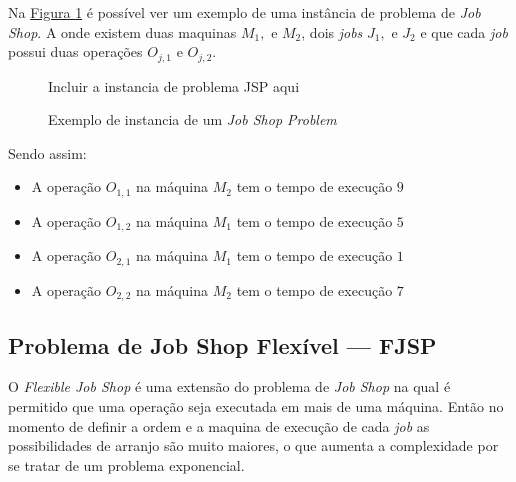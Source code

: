             Na 
            \hyperref[fig:ex-instancia-problema-JSP]{Figura \ref{fig:ex-instancia-problema-JSP}}
            é possível ver um exemplo de uma instância de problema de \textit{Job Shop}. 
            A onde existem duas maquinas $M_1, $ e $M_2$, 
            dois \textit{jobs} $J_1, $ e $J_2$ 
            e que cada \textit{job} possui 
            duas operações $O_{j,1} $ e $O_{j,2}$.\hfill\vspace{\onelineskip}

            \begin{figure}[ht]
                \centering
                \small{Incluir a instancia de problema JSP aqui}
                \caption{Exemplo de instancia de um \textit{Job Shop Problem}}
                \label{fig:ex-instancia-problema-JSP}
            \end{figure}
            
            \noindent Sendo assim:\hfill
            \begin{itemize}
                \item A operação $O_{1,1}$ na máquina $M_2$ tem o tempo de execução $9$
                \item A operação $O_{1,2}$ na máquina $M_1$ tem o tempo de execução $5$
                \item A operação $O_{2,1}$ na máquina $M_1$ tem o tempo de execução $1$
                \item A operação $O_{2,2}$ na máquina $M_2$ tem o tempo de execução $7$
            \end{itemize}
            



    \subsection{Problema de Job Shop Flexível — FJSP}
            O \textit{Flexible Job Shop} é uma extensão do problema de \textit{Job Shop} na qual é permitido que uma operação seja executada em mais de uma máquina. Então no momento de definir a ordem e a maquina de execução de cada \textit{job} as possibilidades de arranjo são muito maiores, o que aumenta a complexidade por se tratar de um problema exponencial.\hfill\vspace{\onelineskip}
            
